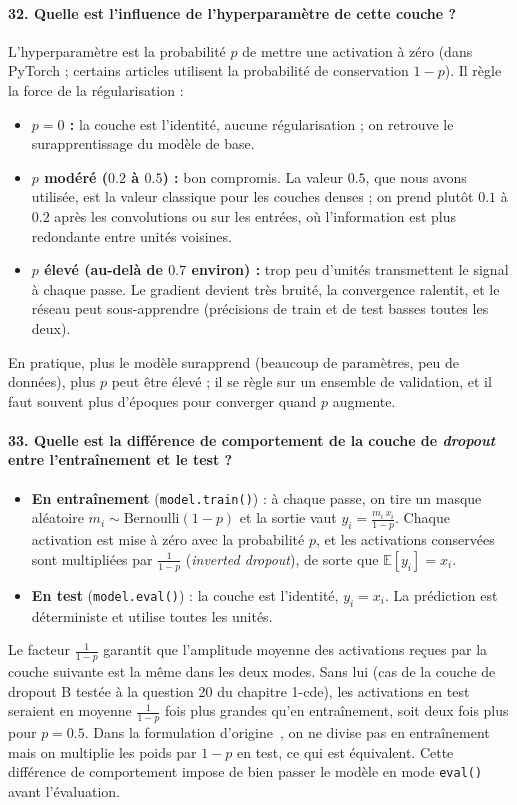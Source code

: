 \documentclass{report}
\begin{document}
\paragraph{32. Quelle est l'influence de l'hyperparamètre de cette couche ?}
 L'hyperparamètre est la probabilité $p$ de mettre une activation à zéro (dans PyTorch ; certains articles utilisent la probabilité de conservation $1-p$). Il règle la force de la régularisation :
\begin{itemize}
    \item \textbf{$p = 0$ :} la couche est l'identité, aucune régularisation ; on retrouve le surapprentissage du modèle de base.
    \item \textbf{$p$ modéré ($0.2$ à $0.5$) :} bon compromis. La valeur $0.5$, que nous avons utilisée, est la valeur classique pour les couches denses ; on prend plutôt $0.1$ à $0.2$ après les convolutions ou sur les entrées, où l'information est plus redondante entre unités voisines.
    \item \textbf{$p$ élevé (au-delà de $0.7$ environ) :} trop peu d'unités transmettent le signal à chaque passe. Le gradient devient très bruité, la convergence ralentit, et le réseau peut sous-apprendre (précisions de train et de test basses toutes les deux).
\end{itemize}
En pratique, plus le modèle surapprend (beaucoup de paramètres, peu de données), plus $p$ peut être élevé ; il se règle sur un ensemble de validation, et il faut souvent plus d'époques pour converger quand $p$ augmente.

\paragraph{33. Quelle est la différence de comportement de la couche de \textit{dropout} entre l'entraînement et le test ?}
 \begin{itemize}
    \item \textbf{En entraînement} (\texttt{model.train()}) : à chaque passe, on tire un masque aléatoire $m_i \sim \text{Bernoulli}(1-p)$ et la sortie vaut $y_i = \frac{m_i\, x_i}{1-p}$. Chaque activation est mise à zéro avec la probabilité $p$, et les activations conservées sont multipliées par $\frac{1}{1-p}$ (\textit{inverted dropout}), de sorte que $\mathbb{E}[y_i] = x_i$.
    \item \textbf{En test} (\texttt{model.eval()}) : la couche est l'identité, $y_i = x_i$. La prédiction est déterministe et utilise toutes les unités.
\end{itemize}
Le facteur $\frac{1}{1-p}$ garantit que l'amplitude moyenne des activations reçues par la couche suivante est la même dans les deux modes. Sans lui (cas de la couche de dropout B testée à la question 20 du chapitre 1-cde), les activations en test seraient en moyenne $\frac{1}{1-p}$ fois plus grandes qu'en entraînement, soit deux fois plus pour $p = 0.5$. Dans la formulation d'origine~\cite{srivastava2014}, on ne divise pas en entraînement mais on multiplie les poids par $1-p$ en test, ce qui est équivalent. Cette différence de comportement impose de bien passer le modèle en mode \texttt{eval()} avant l'évaluation.
\end{document}
